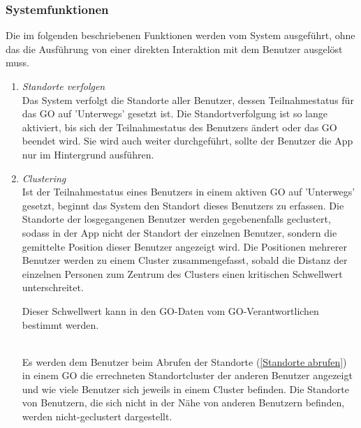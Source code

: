 \documentclass[parskip=full]{scrartcl}
\def\threedigits#1{%
  \ifnum#1<100 0\fi
  \ifnum#1<10 0\fi
  \number#1}
\begin{document}
\subsubsection{Systemfunktionen}
Die im folgenden beschriebenen Funktionen werden vom System ausgeführt, ohne das die Ausführung von einer direkten Interaktion mit dem Benutzer ausgelöst muss.
\begin{enumerate}[label={\textbf{/F\protect\threedigits{\theenumi}0/}}, leftmargin=*, resume]	
	
	\item \textit{Standorte verfolgen}\\
	Das System verfolgt die Standorte aller Benutzer, dessen Teilnahmestatus für das GO auf 'Unterwegs' gesetzt ist. Die Standortverfolgung ist so lange aktiviert, bis sich der Teilnahmestatus des Benutzers ändert oder das GO beendet wird. Sie wird auch weiter durchgeführt, sollte der Benutzer die App nur im Hintergrund ausführen.
	
	\item \textit{Clustering}\label{Clustering} \\
	Ist der Teilnahmestatus eines Benutzers in einem aktiven GO auf 'Unterwegs' gesetzt, beginnt das System den Standort dieses Benutzers zu erfassen. Die Standorte der losgegangenen Benutzer werden gegebenenfalls geclustert, sodass in der App nicht der Standort der einzelnen Benutzer, sondern die gemittelte Position dieser Benutzer angezeigt wird. Die Positionen mehrerer Benutzer werden zu einem Cluster zusammengefasst, sobald die Distanz der einzelnen Personen zum Zentrum des Clusters einen kritischen Schwellwert unterschreitet. \\ 
	
	\colorbox{shadecolor}{\parbox{.9\textwidth}{Dieser Schwellwert kann in den GO-Daten vom GO-Verantwortlichen bestimmt werden.}}\\
	
	 Es werden dem Benutzer beim Abrufen der Standorte (\ref{Standorte abrufen}) in einem GO die errechneten Standortcluster der anderen Benutzer angezeigt und wie viele Benutzer sich jeweils in einem Cluster befinden. Die Standorte von Benutzern, die sich nicht in der Nähe von anderen Benutzern befinden, werden nicht-geclustert dargestellt.
	

\end{enumerate}
\end{document}
